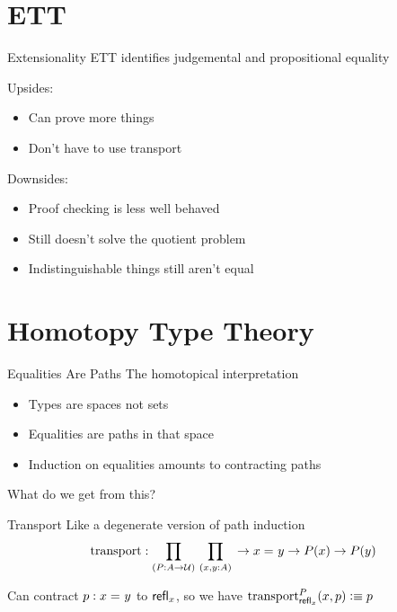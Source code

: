\documentclass[xcolor=svgnames]{beamer}
\begin{document}
\section{ETT}

\begin{frame}{Extensionality}
  ETT identifies judgemental and propositional equality \pause

  Upsides:
  \begin{itemize}
  \item Can prove more things
  \item Don't have to use transport
  \end{itemize} \pause

  Downsides:
  \begin{itemize}
  \item Proof checking is less well behaved
  \item Still doesn't solve the quotient problem
  \item Indistinguishable things still aren't equal
  \end{itemize}
\end{frame}

\section{Homotopy Type Theory}

\begin{frame}{Equalities Are Paths}
  The homotopical interpretation
  \begin{itemize}
  \item Types are spaces not sets
  \item Equalities are paths in that space
  \item Induction on equalities amounts to contracting paths
  \end{itemize}

  What do we get from this? %
\end{frame}

\begin{frame}{Transport}
  Like a degenerate version of path induction
  $$ \mathrm{transport} : \prd{P : A \to \type}{x,y : A} \to \id{x}{y} \to P(x) \to P(y) $$

  Can contract $p : x =_{} y$ to $\mathsf{refl}_{x}$, so we have
  $\mathrm{transport}^P_{\mathsf{refl}_{x}}(x,p) \vcentcolon\equiv p$
\end{frame}
\end{document}
